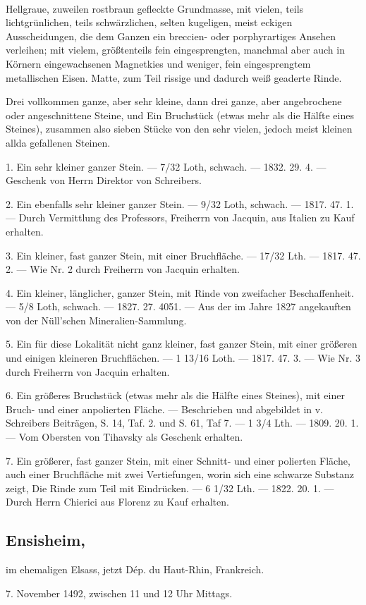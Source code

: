 \documentclass[a4paper, 11pt, oneside, polutonikogreek, german]{article}
\begin{document}
\paragraph{}
Hellgraue, zuweilen rostbraun gefleckte Grundmasse, mit vielen, teils lichtgrünlichen, teils schwärzlichen, selten kugeligen, meist eckigen Ausscheidungen, die dem Ganzen ein breccien- oder porphyrartiges Ansehen verleihen; mit vielem, größtenteils fein eingesprengten, manchmal aber auch in Körnern eingewachsenen Magnetkies und weniger, fein eingesprengtem metallischen Eisen. Matte, zum Teil rissige und dadurch weiß geaderte Rinde.

Drei vollkommen ganze, aber sehr kleine, dann drei ganze, aber angebrochene oder angeschnittene Steine, und Ein Bruchstück (etwas mehr als die Hälfte eines Steines), zusammen also sieben Stücke von den sehr vielen, jedoch meist kleinen allda gefallenen Steinen.

1. Ein sehr kleiner ganzer Stein. — 7/32 Loth, schwach. — 1832. 29. 4. — Geschenk von Herrn Direktor von Schreibers.

2. Ein ebenfalls sehr kleiner ganzer Stein. — 9/32 Loth, schwach. — 1817. 47. 1. — Durch Vermittlung des Professors, Freiherrn von Jacquin, aus Italien zu Kauf erhalten.

3. Ein kleiner, fast ganzer Stein, mit einer Bruchfläche. — 17/32 Lth. — 1817. 47. 2. — Wie Nr. 2 durch Freiherrn von Jacquin erhalten.

4. Ein kleiner, länglicher, ganzer Stein, mit Rinde von zweifacher Beschaffenheit. — 5/8 Loth, schwach. — 1827. 27. 4051. — Aus der im Jahre 1827 angekauften von der Nüll'schen Mineralien-Sammlung.

5. Ein für diese Lokalität nicht ganz kleiner, fast ganzer Stein, mit einer größeren und einigen kleineren Bruchflächen. — 1 13/16 Loth. — 1817. 47. 3. — Wie Nr. 3 durch Freiherrn von Jacquin erhalten.

6. Ein größeres Bruchstück (etwas mehr als die Hälfte eines Steines), mit einer Bruch- und einer anpolierten Fläche. — Beschrieben und abgebildet in v. Schreibers Beiträgen, S. 14, Taf. 2. und S. 61, Taf 7. — 1 3/4 Lth. — 1809. 20. 1. — Vom Obersten von Tihavsky als Geschenk erhalten.

7. Ein größerer, fast ganzer Stein, mit einer Schnitt- und einer polierten Fläche, auch einer Bruchfläche mit zwei Vertiefungen, worin sich eine schwarze Substanz zeigt, Die Rinde zum Teil mit Eindrücken. — 6 1/32 Lth. — 1822. 20. 1. — Durch Herrn Chierici aus Florenz zu Kauf erhalten.
\subsection[Ensisheim.]{Ensisheim,}
\begin{center}
\small
im ehemaligen Elsass, jetzt Dép. du Haut-Rhin, Frankreich.

7. November 1492, zwischen 11 und 12 Uhr Mittags.
\end{center}
\end{document}
